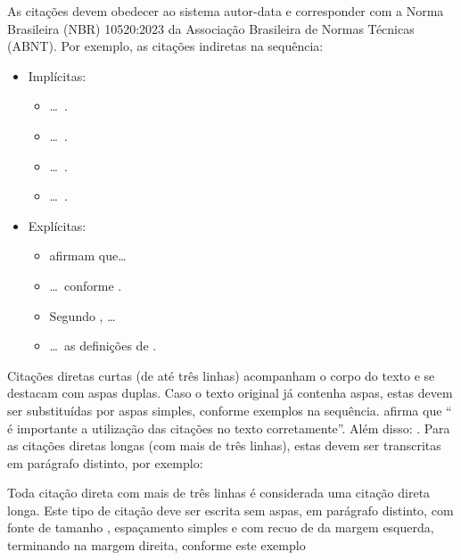 \documentclass[%
  a4paper,%
  12pt,%
  fleqn,%
  english,%
  brazilian,%
]{article}
\begin{document}
As citações devem obedecer ao sistema autor-data e corresponder com a Norma Brasileira (NBR) 10520:2023 da Associação Brasileira de Normas Técnicas (ABNT).
Por exemplo, as citações indiretas na sequência:

\begin{itemize}
\item Implícitas:
\begin{itemize}
\item \ldots\ \cite{Alencar2007}.
\item \ldots\ \cite{Kalakota2002,Ramos2003}.
\item \ldots\ \cite{Carvalho2004,Andujar2006,Purcidonio2008}.
\item \ldots\ \cite{Alencar2007,Carvalho2004}.
\end{itemize}
\item Explícitas:
\begin{itemize}
\item \textcite{Alencar2007} afirmam que\ldots%
\item \ldots\ conforme \textcite{Kalakota2002,Ramos2003}.
\item Segundo \textcite{Carvalho2004,Andujar2006,Purcidonio2008}, \ldots%
\item \ldots\ as definições de \textcite{Alencar2007,Carvalho2004}.
\end{itemize}
\end{itemize}

Citações diretas curtas (de até três linhas) acompanham o corpo do texto e se destacam com aspas duplas.
Caso o texto original já contenha aspas, estas devem ser substituídas por aspas simples, conforme exemplos na sequência.
\textcite[10]{Fulano2021} afirma que \enquote{\textelp{} é importante a utilização das citações no texto corretamente}.
Além disso: .
Para as citações diretas longas (com mais de três linhas), estas devem ser transcritas em parágrafo distinto, por exemplo:

\begin{DisplayCitation}[brazilian]{\cite[150]{Fulano2021}}
Toda citação direta com mais de três linhas é considerada uma citação direta longa.
Este tipo de citação deve ser escrita sem aspas, em parágrafo distinto, com fonte de tamanho , espaçamento simples e com recuo de  da margem esquerda, terminando na margem direita, conforme este exemplo
\end{DisplayCitation}
\end{document}
